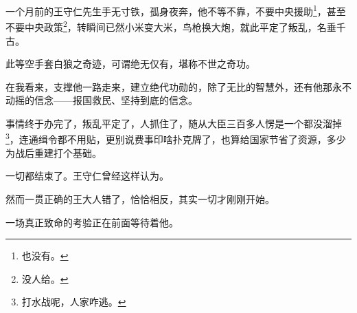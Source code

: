 \begin{multicols}{\theparacolNo}
		一个月前的王守仁先生手无寸铁，孤身夜奔，他不等不靠，不要中央援助\footnote{也没有。}，甚至不要中央政策\footnote{没人给。}，转瞬间已然小米变大米，鸟枪换大炮，就此平定了叛乱，名垂千古。

		此等空手套白狼之奇迹，可谓绝无仅有，堪称不世之奇功。

		在我看来，支撑他一路走来，建立绝代功勋的，除了无比的智慧外，还有他那永不动摇的信念——报国救民、坚持到底的信念。

		事情终于办完了，叛乱平定了，人抓住了，随从大臣三百多人愣是一个都没溜掉\footnote{打水战呢，人家咋逃。}，连通缉令都不用贴，更别说费事印啥扑克牌了，也算给国家节省了资源，多少为战后重建打个基础。

		一切都结束了。王守仁曾经这样认为。

		然而一贯正确的王大人错了，恰恰相反，其实一切才刚刚开始。

		一场真正致命的考验正在前面等待着他。
		\ifnum{}
	\end{multicols}
\fi
\newpage
